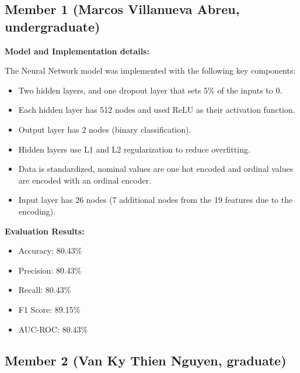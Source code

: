 \documentclass[11pt,a4paper]{article}
\begin{document}
\subsection{Member 1 (Marcos Villanueva Abreu, undergraduate)}

\begin{tcolorbox}[
        title=Neural Network Implementation,
        colback=lightblue!30,
        colframe=darkblue,
        boxrule=0.5pt,
        fonttitle=\bfseries\sffamily\footnotesize,
        fontupper=\footnotesize
    ]
    \textbf{Model and Implementation details:}

    The Neural Network model was implemented with the following key components:
    \begin{itemize}[leftmargin=*, itemsep=2pt, parsep=0pt]
        \item Two hidden layers, and one dropout layer that sets 5\% of the inputs to 0.
        \item Each hidden layer has 512 nodes and used ReLU as their activation function.
        \item Output layer has 2 nodes (binary classification).
        \item Hidden layers use L1 and L2 regularization to reduce overfitting.
        \item Data is standardized, nominal values are one hot encoded and ordinal values are encoded with an ordinal encoder.
        \item Input layer has 26 nodes (7 additional nodes from the 19 features due to the encoding).
    \end{itemize}

    \textbf{Evaluation Results:}
    \begin{itemize}[leftmargin=*, itemsep=2pt, parsep=0pt]
        \item Accuracy: 80.43\%
        \item Precision: 80.43\%
        \item Recall: 80.43\%
        \item F1 Score: 89.15\%
        \item AUC-ROC: 80.43\%
    \end{itemize}
\end{tcolorbox}

\subsection{Member 2 (Van Ky Thien Nguyen, graduate)}
\end{document}
